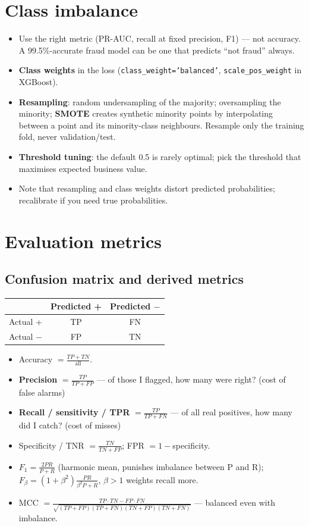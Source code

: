 \section{Class imbalance}
\begin{itemize}
  \item Use the right metric (PR-AUC, recall at fixed precision, F1) --- not accuracy. A 99.5\%-accurate fraud model can be one that predicts ``not fraud'' always.
  \item \textbf{Class weights} in the loss (\texttt{class\_weight='balanced'}, \texttt{scale\_pos\_weight} in XGBoost).
  \item \textbf{Resampling}: random undersampling of the majority; oversampling the minority; \textbf{SMOTE} creates synthetic minority points by interpolating between a point and its minority-class neighbours. Resample only the training fold, never validation/test.
  \item \textbf{Threshold tuning}: the default 0.5 is rarely optimal; pick the threshold that maximises expected business value.
  \item Note that resampling and class weights distort predicted probabilities; recalibrate if you need true probabilities.
\end{itemize}

\section{Evaluation metrics}

\subsection{Confusion matrix and derived metrics}
\begin{center}
\begin{tabular}{@{}l|cc@{}}
 & Predicted + & Predicted $-$\\ \hline
Actual + & TP & FN\\
Actual $-$ & FP & TN
\end{tabular}
\end{center}
\begin{itemize}
  \item Accuracy $=\frac{TP+TN}{\text{all}}$.
  \item \textbf{Precision} $=\frac{TP}{TP+FP}$ --- of those I flagged, how many were right? (cost of false alarms)
  \item \textbf{Recall / sensitivity / TPR} $=\frac{TP}{TP+FN}$ --- of all real positives, how many did I catch? (cost of misses)
  \item Specificity / TNR $=\frac{TN}{TN+FP}$; FPR $=1-$specificity.
  \item $F_1=\frac{2PR}{P+R}$ (harmonic mean, punishes imbalance between P and R); $F_\beta=(1+\beta^2)\frac{PR}{\beta^2P+R}$, $\beta>1$ weights recall more.
  \item MCC $=\frac{TP\cdot TN-FP\cdot FN}{\sqrt{(TP+FP)(TP+FN)(TN+FP)(TN+FN)}}$ --- balanced even with imbalance.
\end{itemize}

